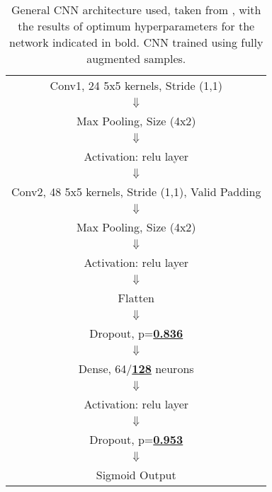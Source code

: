 \documentclass[11pt]{article}
\begin{document}
\begin{table}[h!]
	\centering
		\caption{General CNN architecture used, taken from \cite{salamon2017deep}, with the results of optimum hyperparameters for the network indicated in bold. CNN trained using fully augmented samples.\newline}
	\begin{tabular}{c}
		Conv1, 24 5x5 kernels, Stride (1,1)						                \\
		$\Downarrow$ 													\\
		Max Pooling, Size (4x2)                                        \\
		$\Downarrow$ 													\\
		Activation: relu layer                                            \\

		$\Downarrow$ 													\\
		Conv2, 48 5x5 kernels, Stride (1,1), Valid Padding                      \\
		$\Downarrow$ 													\\
		Max Pooling, Size (4x2)                                         \\
		$\Downarrow$ 													\\
		Activation: relu layer                                          \\
		$\Downarrow$ 													\\

		Flatten                                                         \\
		$\Downarrow$ 													\\
		Dropout, p=\textbf{\underline{0.836}}                                                     \\
		$\Downarrow$ 													\\
		Dense, 64/\textbf{\underline{128}} neurons                                           \\
		$\Downarrow$ 													\\
		Activation: relu layer                                           \\
		$\Downarrow$ 													\\
		Dropout, p=\textbf{\underline{0.953}}                                                     \\
		$\Downarrow$ 													\\
		Sigmoid Output                                                 
	\end{tabular}
\end{table}
\end{document}
